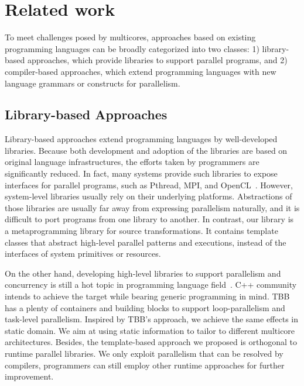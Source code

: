\section{Related work}
\label{sec:related}


To meet challenges posed by multicores, approaches based on existing
programming languages can be broadly categorized into two classes: 1) library-based approaches, which
provide libraries to support parallel programs, and 2) compiler-based
approaches, which extend programming languages with new language grammars or
constructs for parallelism.

\subsection{Library-based Approaches}

Library-based approaches extend programming languages
by well-developed libraries. Because both development and adoption of
the libraries are based on original language infrastructures, the
efforts taken by programmers are significantly reduced. In fact, many systems provide
such libraries to expose interfaces for parallel programs, such as
Pthread, MPI, and OpenCL~\cite{opencl}. However, system-level libraries usually rely on 
their underlying platforms. Abstractions
of those libraries are usually far away from expressing parallelism
naturally, and it is difficult to
port programs from one library to another. In contrast, our library is a
metaprogramming library for source transformations. It contains template classes
that abstract high-level parallel patterns and executions, instead of the
interfaces of system primitives or resources.

On the other hand, developing high-level
libraries to support parallelism and concurrency is still a hot topic in
programming language field~\cite{javacon, wincon}. C++ community intends to
achieve the target while bearing generic programming in mind.  TBB~\cite{tbb} has a plenty of
containers and building blocks to support loop-parallelism and
task-level parallelism.  Inspired by TBB's approach, we achieve the
same effects in static domain. We aim at using static information
to tailor to different multicore architectures. Besides, the template-based
approach we proposed is orthogonal to runtime parallel libraries. We
only exploit parallelism that can be resolved by compilers,
programmers can still employ other runtime approaches for further improvement.

